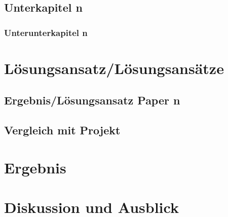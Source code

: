 \documentclass[headsepline,titlepage,twoside,12pt]{report}
\newcommand\todo[1]{}%
\begin{document}
\section{Unterkapitel n}
\subsection{Unterunterkapitel n}

\chapter{Lösungsansatz/Lösungsansätze \todo{(bezogen auf Paper, 2--4 Seiten)}}
\todo{Kapitel 3 ist Vorschlag gedacht, der nicht wörtlich übernommen werden muss.
Der Lösungsansatz ist eine kurze Beschreibung der Arbeitshypothese sowie des Vorgehens zur Lösung der in der Einleitung beschriebenen Probleme.}

\section{Ergebnis/Lösungsansatz Paper n}
\section{Vergleich mit Projekt}

\chapter{Ergebnis \todo{der Seminararbeit, 1--2 Seiten, ihre Ergebnisse}}
\todo{
Im Ergebniskapitel soll beschrieben werden, inwiefern Sie Ihre in 1.2/1.3 aufgestellten Ziele bzw. Aufgaben im Rahmen der Seminararbeit erreicht wurden oder auch weshalb sie (teilweise) nicht erreicht werden konnten.
So soll es möglich sein, dass ein Leser von der Arbeit lediglich die Einleitung und die Zusammenfassung liest und doch die Ergebnisse der Arbeit erfassen kann.
Dieses Kapitel kann auch in mehrere Unterkapitel aufgeteilt werden, wenn das sinnvoll ist!
}

\chapter{Diskussion und Ausblick \todo{1--2 Seiten}}
\todo{
In der Diskussion wird das Ergebnis der Arbeit noch einmal kritisch bewertet.
Dies umfasst auch neue Probleme, die erst während der Bearbeitung erkannt wurden.
Die Eignung für ein konkretes Forschungsprojekt sollte hier diskutiert werden.
In der Diskussion kann auch die Kritik des Autors an dem stehen, was er in der Literatur zu dem zu bearbeitenden Thema hier und da gelesen hat.
Außerdem soll ein Ausblick gegeben werden, welche weiteren Fragestellungen noch bearbeitet werden sollten.
}
\end{document}
